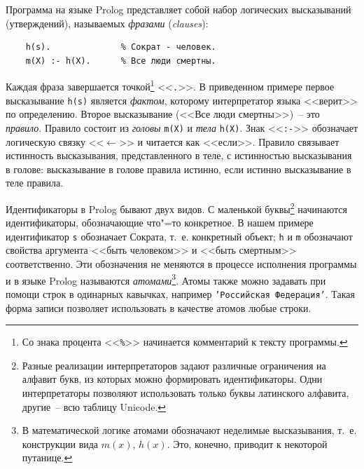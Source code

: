 \documentclass[a4paper,14pt, openany, twoside, final]{extbook} %
\newcommand{\eeng}[1]{\emph{\foreignlanguage{english}{#1}}}
\begin{document}
Программа на языке Prolog представляет собой набор логических высказываний (утверждений), называемых \emph{фразами} (\eeng{clauses}):

\begin{verbatim}
    h(s).              % Сократ - человек.
    m(X) :- h(X).      % Все люди смертны.
\end{verbatim}

  Каждая фраза завершается точкой\footnote{Со знака процента <<\texttt{\%}>> начинается комментарий к тексту программы.}  <<\texttt{.}>>.  В приведенном примере первое высказывание \texttt{h(s)} является \emph{фактом}, которому интерпретатор языка <<верит>> по определению.  Второе высказывание (<<Все люди смертны>>)~-- это \emph{правило}.  Правило состоит из \emph{головы} \texttt{m(X)} и \emph{тела} \texttt{h(X)}.  Знак <<\texttt{:-}>> обозначает логическую связку <<$\leftarrow$>> и читается как <<если>>.  Правило связывает истинность высказывания, представленного в теле, с истинностью высказывания в голове: высказывание в голове правила истинно, если истинно высказывание в теле правила.


Идентификаторы в Prolog бывают двух видов.  С маленькой буквы\footnote{Разные реализации интерпретаторов задают различные ограничения на алфавит букв, из которых можно формировать идентификаторы.  Одни интерпретаторы позволяют использовать только буквы латинского алфавита, другие~-- всю таблицу Unicode.} начинаются идентификаторы, обозначающие что"=то конкретное.  В нашем примере идентификатор \texttt{s} обозначает Сократа, т.~е. конкретный объект; \texttt{h} и \texttt{m} обозначают свойства аргумента <<быть человеком>> и <<быть смертным>> соответственно.  Эти обозначения не меняются в процессе исполнения программы и в языке Prolog называются \emph{атомами}\footnote{В математической логике атомами обозначают неделимые высказывания, т.~е. конструкции вида $m(x)$, $h(x)$.  Это, конечно, приводит к некоторой путанице.}.  Атомы также можно задавать при помощи строк в одинарных кавычках, например \texttt{'Российская Федерация'}.  Такая форма записи позволяет использовать в качестве атомов любые строки.
\end{document}
